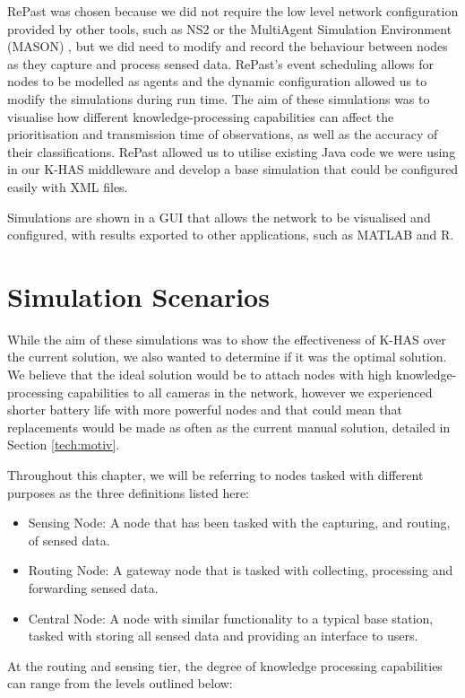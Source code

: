 RePast was chosen because we did not require the low level network configuration provided by other tools, such as NS2 \cite{mccanne1997network} or the MultiAgent Simulation Environment (MASON) \cite{mason}, but we did need to modify and record the behaviour between nodes as they capture and process sensed data. RePast's event scheduling allows for nodes to be modelled as agents and the dynamic configuration allowed us to modify the simulations during run time. The aim of these simulations was to visualise how different knowledge-processing capabilities can affect the prioritisation and transmission time of observations, as well as the accuracy of their classifications. RePast allowed us to utilise existing Java code we were using in our K-HAS middleware and develop a base simulation that could be configured easily with XML files.

Simulations are shown in a GUI that allows the network to be visualised and configured, with results exported to other applications, such as MATLAB and R.

\section{Simulation Scenarios}\label{sim:scen}
While the aim of these simulations was to show the effectiveness of K-HAS over the current solution, we also wanted to determine if it was the optimal solution. We believe that the ideal solution would be to attach nodes with high knowledge-processing capabilities to all cameras in the network, however we experienced shorter battery life with more powerful nodes and that could mean that replacements would be made as often as the current manual solution, detailed in Section \ref{tech:motiv}.

Throughout this chapter, we will be referring to nodes tasked with different purposes as the three definitions listed here:
	\begin{itemize}
		\item Sensing Node: A node that has been tasked with the capturing, and routing, of sensed data.
		\item Routing Node: A gateway node that is tasked with collecting, processing and forwarding sensed data.
		\item Central Node: A node with similar functionality to a typical base station, tasked with storing all sensed data and providing an interface to users.
	\end{itemize}

At the routing and sensing tier, the degree of knowledge processing capabilities can range from the levels outlined below:

